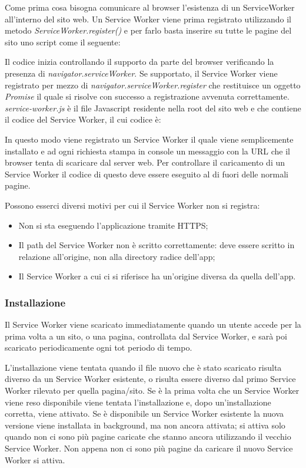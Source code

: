 \documentclass[11pt ,a4paper , twoside , openright ]{article}
\begin{document}
Come prima cosa bisogna comunicare al browser l’esistenza di un ServiceWorker all’interno del sito web. Un Service Worker viene prima registrato utilizzando il metodo \textit{ServiceWorker.register()} e per farlo basta inserire su tutte le pagine del sito uno script come il seguente:

Il codice inizia controllando il supporto da parte del browser verificando la presenza di \textit{navigator.serviceWorker}. Se supportato, il Service Worker viene registrato per mezzo di \textit{navigator.serviceWorker.register} che restituisce un oggetto \textit{Promise} il quale si risolve con successo a registrazione avvenuta correttamente.
\textit{service-worker.js} è il file Javascript residente nella root del sito web e che contiene il codice del Service Worker, il cui codice è:
\pagebreak

In questo modo viene registrato un Service Worker il quale viene semplicemente installato e ad ogni richiesta stampa in console un messaggio con la URL che il browser tenta di scaricare dal server web. Per controllare il caricamento di un Service Worker il codice di questo deve essere eseguito al di fuori delle normali pagine.

Possono esserci diversi motivi per cui il Service Worker non si registra:
\begin{itemize}
	\item Non si sta eseguendo l'applicazione tramite HTTPS;
	\item Il path del Service Worker non è scritto correttamente: deve essere scritto in relazione all'origine, non alla directory radice dell'app;
	\item Il Service Worker a cui ci si riferisce ha un'origine diversa da quella dell'app.
\end{itemize}

\subsubsection{Installazione}
Il Service Worker viene scaricato immediatamente quando un utente accede per la prima volta a un sito, o una pagina, controllata dal Service Worker, e sarà poi scaricato periodicamente ogni tot periodo di tempo.

L'installazione viene tentata quando il file nuovo che è stato scaricato risulta diverso da un Service Worker esistente, o risulta essere diverso dal primo Service Worker rilevato per quella pagina/sito. Se è la prima volta che un Service Worker viene reso disponibile viene tentata l'installazione e, dopo un'installazione corretta, viene attivato. Se è disponibile un Service Worker esistente la nuova versione viene installata in background, ma non ancora attivata; si attiva solo quando non ci sono più pagine caricate che stanno ancora utilizzando il vecchio Service Worker. Non appena non ci sono più pagine da caricare il nuovo Service Worker si attiva.
\end{document}
